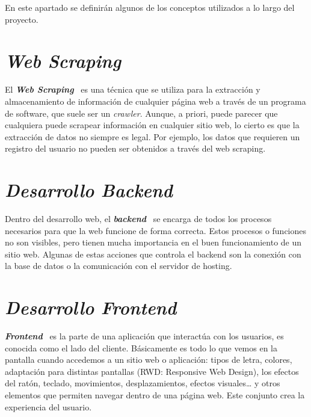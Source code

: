 
En este apartado se definirán algunos de los conceptos utilizados a lo largo del proyecto.

\section{\textit{Web Scraping}}
El \textbf{\textit{Web Scraping}}~\cite{webScrap} es una técnica que se utiliza para la extracción y almacenamiento de información de cualquier página web a través de un programa de software, que suele ser un \textit{crawler}. Aunque, a priori, puede parecer que cualquiera puede scrapear información en cualquier sitio web, lo cierto es que la extracción de datos no siempre es legal. Por ejemplo, los datos que requieren un registro del usuario no pueden ser obtenidos a través del web scraping.

\section{\textit{Desarrollo Backend}}
Dentro del desarrollo web, el \textbf{\textit{backend}}~\cite{backend} se encarga de todos los procesos necesarios para que la web funcione de forma correcta. Estos procesos o funciones no son visibles, pero tienen mucha importancia en el buen funcionamiento de un sitio web. Algunas de estas acciones que controla el backend son la conexión con la base de datos o la comunicación con el servidor de hosting.

\section{\textit{Desarrollo Frontend}}
\textbf{\textit{Frontend}}~\cite{Frontend} es la parte de una aplicación que interactúa con los usuarios, es conocida como el lado del cliente. Básicamente es todo lo que vemos en la pantalla cuando accedemos a un sitio web o aplicación: tipos de letra, colores, adaptación para distintas pantallas (RWD: Responsive Web Design), los efectos del ratón, teclado, movimientos, desplazamientos, efectos visuales… y otros elementos que permiten navegar dentro de una página web. Este conjunto crea la experiencia del usuario.

